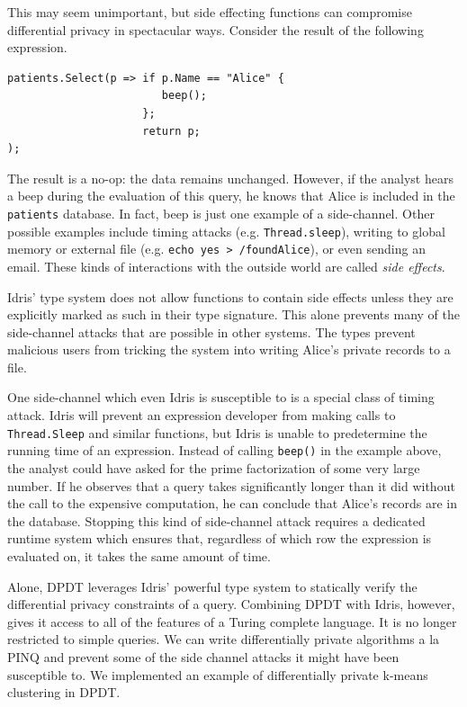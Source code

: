 \documentclass[12pt]{report}
\begin{document}
This may seem unimportant, but side effecting functions can compromise differential privacy in spectacular ways.
Consider the result of the following expression.

\begin{lstlisting}[caption={Example side-channel attack}]
patients.Select(p => if p.Name == "Alice" {
                        beep();
                     };
                     return p;
);
\end{lstlisting}

The result is a no-op: the data remains unchanged.
However, if the analyst hears a beep during the evaluation of this query, he knows that Alice is included in the \texttt{patients} database.
In fact, beep is just one example of a side-channel.
Other possible examples include timing attacks (e.g. \texttt{Thread.sleep}), writing to global memory or external file (e.g. \texttt{echo yes > /foundAlice}), or even sending an email.
These kinds of interactions with the outside world are called \textit{side effects}.

Idris' type system does not allow functions to contain side effects unless they are explicitly marked as such in their type signature.
This alone prevents many of the side-channel attacks that are possible in other systems.
The types prevent malicious users from tricking the system into writing Alice's private records to a file.

One side-channel which even Idris is susceptible to is a special class of timing attack.
Idris will prevent an expression developer from making calls to \texttt{Thread.Sleep} and similar functions, but Idris is unable to predetermine the running time of an expression.
Instead of calling \texttt{beep()} in the example above, the analyst could have asked for the prime factorization of some very large number.
If he observes that a query takes significantly longer than it did without the call to the expensive computation, he can conclude that Alice's records are in the database.
Stopping this kind of side-channel attack requires a dedicated runtime system which ensures that, regardless of which row the expression is evaluated on, it takes the same amount of time\cite{conf/uss/HaeberlenPN11}.

Alone, DPDT leverages Idris' powerful type system to statically verify the differential privacy constraints of a query.
Combining DPDT with Idris, however, gives it access to all of the features of a Turing complete language.
It is no longer restricted to simple queries.
We can write differentially private algorithms a la PINQ and prevent some of the side channel attacks it might have been susceptible to.
We implemented an example of differentially private k-means clustering in DPDT.
\end{document}
